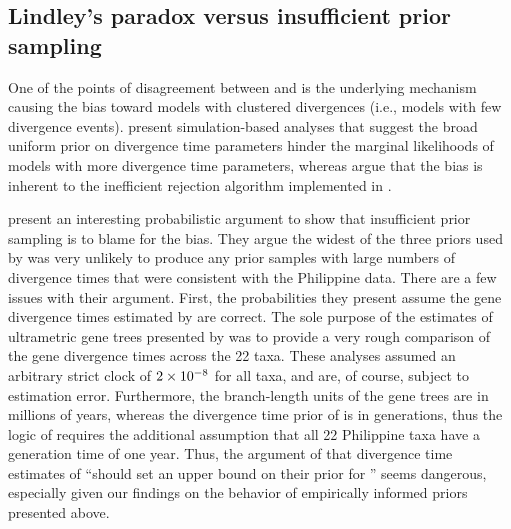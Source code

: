 \documentclass[letterpaper,12pt]{article}
\begin{document}
\begin{linenumbers}
\section*{Lindley's paradox versus insufficient prior sampling}
One of the points of disagreement between \citet{Hickerson2013} and
\citet{Oaks2012} is the underlying mechanism causing the bias toward models
with clustered divergences (i.e., models with few divergence events).
\citet{Oaks2012} present simulation-based analyses that suggest the broad
uniform prior on divergence time parameters hinder the marginal likelihoods of
models with more divergence time parameters, whereas \citet{Hickerson2013}
argue that the bias is inherent to the inefficient rejection algorithm
implemented in \msb.

\citet{Hickerson2013} present an interesting probabilistic argument
 to show that insufficient prior sampling is to blame for the bias.
They argue the widest of the three priors used by \citet{Oaks2012} was very
unlikely to produce any prior samples with large numbers of divergence times
that were consistent with the Philippine data.
There are a few issues with their argument.
First, the probabilities they present assume the gene divergence times
estimated by \citet{Oaks2012} are correct.
The sole purpose of the estimates of ultrametric gene trees presented by
\citet{Oaks2012} was to provide a very rough comparison of the gene divergence
times across the 22 taxa.  These analyses assumed an arbitrary strict clock of
$2\times 10^{-8}$ for all taxa, and are, of course, subject to estimation error.
Furthermore, the branch-length units of the gene trees are in millions of
years, whereas the divergence time prior of \msb is in generations, thus the
logic of \citet{Hickerson2013} requires the additional assumption that all 22
Philippine taxa have a generation time of one year.
Thus, the argument of \citet{Hickerson2013} that divergence time estimates of
\citet{Oaks2012} ``should set an upper bound on their prior for \divt{}'' seems
dangerous, especially given our findings on the behavior of empirically
informed priors presented above.


\end{linenumbers}
\end{document}
